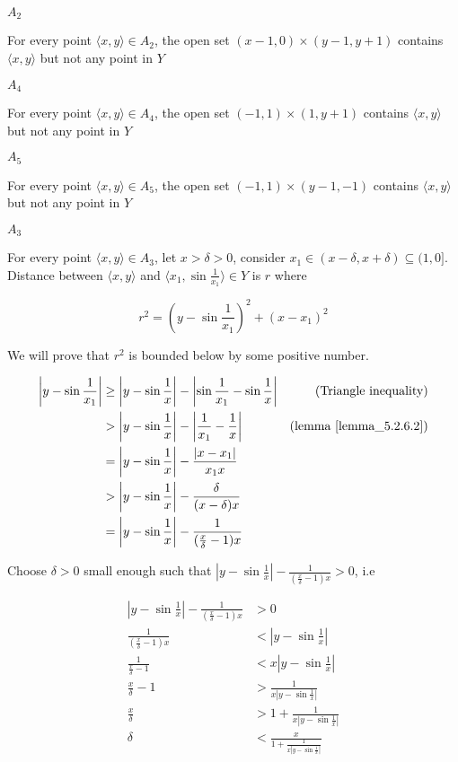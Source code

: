 \documentclass{article}
\begin{document}
$A_2$

For every point $\langle x, y \rangle \in A_2$, the open set $(x-1, 0) \times (y-1, y+1)$ contains $\langle x, y \rangle$ but not any point in $Y$

$A_4$

For every point $\langle x, y \rangle \in A_4$, the open set $(-1, 1) \times (1, y+1)$ contains $\langle x, y \rangle$ but not any point in $Y$

$A_5$

For every point $\langle x, y \rangle \in A_5$, the open set $(-1, 1) \times (y-1, -1)$ contains $\langle x, y \rangle$ but not any point in $Y$

$A_3$

For every point $\langle x, y \rangle \in A_3$, let $x > \delta > 0$, consider $x_1 \in (x - \delta, x+\delta) \subseteq (1, 0]$. Distance between $\langle x, y \rangle$ and $\langle x_1, \sin \frac{1}{x_1} \rangle \in Y$ is $r$ where

$$
    r^2 = \left(y - \sin \frac{1}{x_1}\right)^2 + \left(x - x_1\right)^2
$$

We will prove that $r^2$ is bounded below by some positive number.

\begin{align*}
    \left| y - \sin \frac{1}{x_1} \right|
        &\geq \left| y - \sin \frac{1}{x} \right| - \left| \sin \frac{1}{x_1} - \sin \frac{1}{x} \right| &\text{(Triangle inequality)}\\
        &> \left| y - \sin \frac{1}{x} \right| - \left| \frac{1}{x_1} - \frac{1}{x}\right| &\text{(lemma \ref{lemma_5.2.6.2})} \\
        &= \left| y - \sin \frac{1}{x} \right| - \frac{|x - x_1|}{x_1 x} \\
        &> \left| y - \sin \frac{1}{x} \right| - \frac{\delta}{(x - \delta) x} \\
        &= \left| y - \sin \frac{1}{x} \right| - \frac{1}{(\frac{x}{\delta} - 1) x} \\
\end{align*}

Choose $\delta > 0$ small enough such that $\left| y - \sin \frac{1}{x} \right| - \frac{1}{(\frac{x}{\delta} - 1) x} > 0$, i.e

\begin{align*}
    \left| y - \sin \frac{1}{x} \right| - \frac{1}{(\frac{x}{\delta} - 1) x}
    &> 0 \\
    \frac{1}{(\frac{x}{\delta} - 1) x} &< \left| y - \sin \frac{1}{x} \right| \\
    \frac{1}{\frac{x}{\delta} - 1} &< x \left| y - \sin \frac{1}{x} \right| \\
    \frac{x}{\delta} - 1 &> \frac{1}{x \left| y - \sin \frac{1}{x} \right|} \\
    \frac{x}{\delta} &> 1 + \frac{1}{x \left| y - \sin \frac{1}{x} \right|} \\
    \delta &< \frac{x}{1 + \frac{1}{x \left| y - \sin \frac{1}{x} \right|}} \\
\end{align*}
\end{document}
